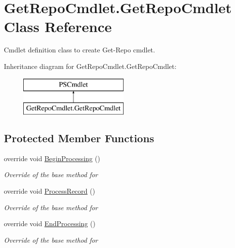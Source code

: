 \hypertarget{class_get_repo_cmdlet_1_1_get_repo_cmdlet}{}\section{Get\+Repo\+Cmdlet.\+Get\+Repo\+Cmdlet Class Reference}
\label{class_get_repo_cmdlet_1_1_get_repo_cmdlet}


Cmdlet definition class to create Get-\/\+Repo cmdlet.  


Inheritance diagram for Get\+Repo\+Cmdlet.\+Get\+Repo\+Cmdlet\+:\begin{figure}[H]
\begin{center}
\leavevmode
\includegraphics[height=2.000000cm]{class_get_repo_cmdlet_1_1_get_repo_cmdlet}
\end{center}
\end{figure}
\subsection*{Protected Member Functions}
\begin{DoxyCompactItemize}
\item 
override void \mbox{\hyperlink{class_get_repo_cmdlet_1_1_get_repo_cmdlet_a22503338cdb62a648a848cd8fcbf7769}{Begin\+Processing}} ()
\begin{DoxyCompactList}\small\item\em Override of the base method for \end{DoxyCompactList}\item 
override void \mbox{\hyperlink{class_get_repo_cmdlet_1_1_get_repo_cmdlet_ada76037eb2a8eed81eb1bb7a21d84693}{Process\+Record}} ()
\begin{DoxyCompactList}\small\item\em Override of the base method for \end{DoxyCompactList}\item 
override void \mbox{\hyperlink{class_get_repo_cmdlet_1_1_get_repo_cmdlet_a0968e20b2c03f033c93c2a74c643d06b}{End\+Processing}} ()
\begin{DoxyCompactList}\small\item\em Override of the base method for \end{DoxyCompactList}\end{DoxyCompactItemize}
